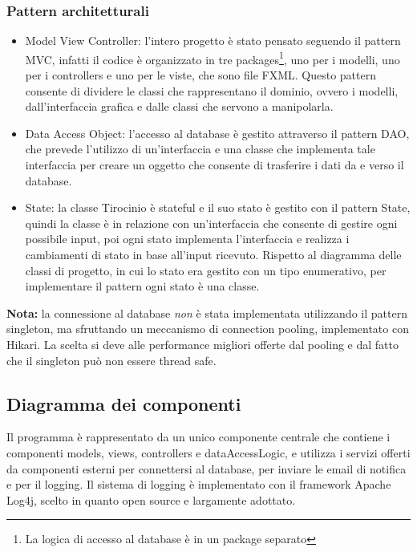 \documentclass[12pt]{article}
\begin{document}
\subsubsection{Pattern architetturali}
\begin{itemize}
   \item Model View Controller: l'intero progetto è stato pensato seguendo il pattern MVC, infatti il codice è organizzato in tre packages\footnote{La logica di accesso al database è in un package separato}, uno per i modelli, uno per i controllers e uno per le viste, che sono file FXML. Questo pattern consente di dividere le classi che rappresentano il dominio, ovvero i modelli, dall'interfaccia grafica e dalle classi che servono a manipolarla.
   \item Data Access Object: l'accesso al database è gestito attraverso il pattern DAO, che prevede l'utilizzo di un'interfaccia e una classe che implementa tale interfaccia per creare un oggetto che consente di trasferire i dati da e verso il database.
   \item State: la classe Tirocinio è stateful e il suo stato è gestito con il pattern State, quindi la classe è in relazione con un'interfaccia che consente di gestire ogni possibile input, poi ogni stato implementa l'interfaccia e realizza i cambiamenti di stato in base all'input ricevuto. Rispetto al diagramma delle classi di progetto, in cui lo stato era gestito con un tipo enumerativo, per implementare il pattern ogni stato è una classe.
\end{itemize}
\textbf{Nota:} la connessione al database \emph{non} è stata implementata utilizzando il pattern singleton, ma sfruttando un meccanismo di connection pooling, implementato con Hikari. La scelta si deve alle performance migliori offerte dal pooling e dal fatto che il singleton può non essere thread safe.

\newpage


\subsection{Diagramma dei componenti}

Il programma è rappresentato da un unico componente centrale che contiene i componenti models, views, controllers e dataAccessLogic, e utilizza i servizi offerti da componenti esterni per connettersi al database, per inviare le email di notifica e per il logging. Il sistema di logging è implementato con il framework Apache Log4j, scelto in quanto open source e largamente adottato.
\end{document}
